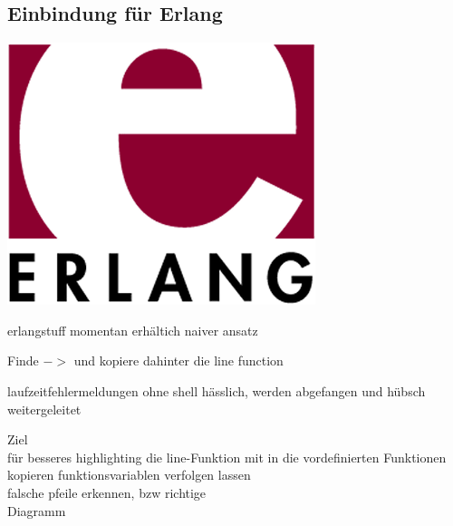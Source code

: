 \subsection{Einbindung für Erlang}

\begin{frame}
\begin{center}
\includegraphics[scale=0.5]{erlang/pics/erlang.png}
\end{center}
\end{frame}

\begin{frame}

\end{frame}

\begin{frame}
erlangstuff momentan erhältich
naiver ansatz 

Finde $->$ und kopiere dahinter die line function

\end{frame}

\begin{frame}
laufzeitfehlermeldungen ohne shell hässlich, werden abgefangen und hübsch weitergeleitet
\end{frame}

\begin{frame}
Ziel\\
für besseres highlighting die line-Funktion mit in die vordefinierten Funktionen kopieren
funktionsvariablen verfolgen lassen\\
falsche pfeile erkennen, bzw richtige\\
Diagramm
\end{frame}
